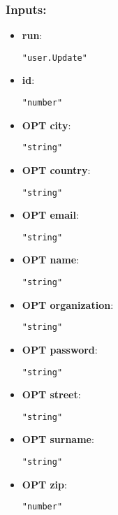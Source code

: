 \subsubsection*{Inputs:}
\begin{itemize}
    \item \textbf{run}: 
\begin{lstlisting}
"user.Update"
\end{lstlisting}
    \item \textbf{id}: 
\begin{lstlisting}
"number"
\end{lstlisting}
    \item \textbf{OPT city}: 
\begin{lstlisting}
"string"
\end{lstlisting}
    \item \textbf{OPT country}: 
\begin{lstlisting}
"string"
\end{lstlisting}
    \item \textbf{OPT email}: 
\begin{lstlisting}
"string"
\end{lstlisting}
    \item \textbf{OPT name}: 
\begin{lstlisting}
"string"
\end{lstlisting}
    \item \textbf{OPT organization}: 
\begin{lstlisting}
"string"
\end{lstlisting}
    \item \textbf{OPT password}: 
\begin{lstlisting}
"string"
\end{lstlisting}
    \item \textbf{OPT street}: 
\begin{lstlisting}
"string"
\end{lstlisting}
    \item \textbf{OPT surname}: 
\begin{lstlisting}
"string"
\end{lstlisting}
    \item \textbf{OPT zip}: 
\begin{lstlisting}
"number"
\end{lstlisting}
  \end{itemize}

